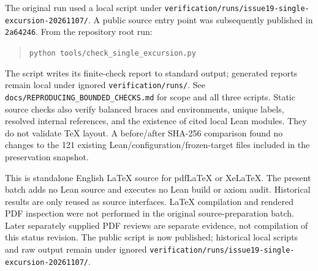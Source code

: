 \documentclass[11pt]{article}
\theoremstyle{remark}
\newcommand{\code}[1]{\nolinkurl{#1}}
\begin{document}
The original run used a local script under
\code{verification/runs/issue19-single-excursion-20261107/}.
A public source entry point was subsequently published in \code{2a64246}.
From the repository root run:
\begin{quote}
\texttt{python tools/check\_single\_excursion.py}
\end{quote}
The script writes its finite-check report to standard output; generated
reports remain local under ignored \code{verification/runs/}.
See \code{docs/REPRODUCING_BOUNDED_CHECKS.md} for scope and all three scripts.
Static source checks also verify balanced braces and environments, unique
labels, resolved internal references, and the existence of cited local Lean
modules. They do not validate TeX layout. A before/after SHA-256 comparison
found no changes to the 121 existing Lean/configuration/frozen-target files
included in the preservation snapshot.

This is standalone English LaTeX source for pdfLaTeX or XeLaTeX.
The present batch adds no Lean source and executes no Lean build or axiom
audit. Historical results are only reused as source interfaces.
LaTeX compilation and rendered PDF inspection were not performed in the
original source-preparation batch. Later separately supplied PDF reviews
are separate evidence, not compilation of this status revision.
The public script is now published; historical local scripts and raw output remain under ignored
\code{verification/runs/issue19-single-excursion-20261107/}.
\end{document}
